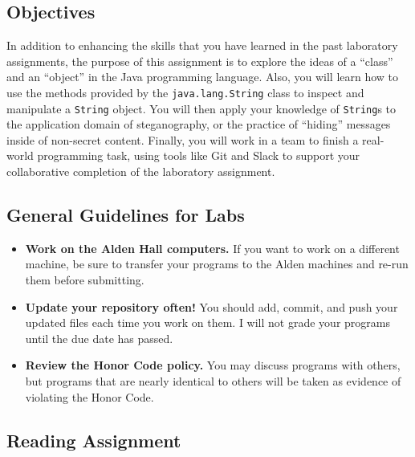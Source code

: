 



\subsection*{Objectives}
\vspace{-0.05in}

In addition to enhancing the skills that you have learned in the past laboratory assignments, the purpose of this
assignment is to explore the ideas of a ``class'' and an ``object'' in the Java programming language.  Also, you will
learn how to use the methods provided by the {\tt java.lang.String} class to inspect and manipulate a {\tt String}
object. You will then apply your knowledge of {\tt String}s to the application domain of steganography, or the practice
of ``hiding'' messages inside of non-secret content. Finally, you will work in a team to finish a real-world programming
task, using tools like Git and Slack to support your collaborative completion of the laboratory assignment.

\vspace{-0.05in}
\subsection*{General Guidelines for Labs}

\vspace{-0.05in}
\begin{itemize}
\item
{\bf Work on the Alden Hall computers.} If you want to work on a different
machine, be sure to transfer your programs to the Alden
machines and re-run them before submitting.
\item
{\bf Update your repository often!} You should add, commit,
and push your updated files each time you work on them.  I will not grade
your programs until the due date has passed.
\item
{\bf Review the Honor Code policy.} You
may discuss programs with others, but programs that are nearly identical
to others will be taken as evidence of violating the Honor Code.
\end{itemize}

\vspace{-0.2in}
\subsection*{Reading Assignment}
\vspace{-0.05in}

